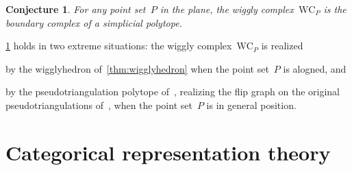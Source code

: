 \documentclass[submission]{FPSAC2025}
\newtheorem{conjecture}[theorem]{Conjecture}
\theoremstyle{definition}
\newcommand{\wigglyComplex}{\mathrm{WC}} %
\begin{document}
\begin{conjecture}
\label{conj:polytopality}
For any point set~$P$ in the plane, the wiggly complex~$\wigglyComplex_P$ is the boundary complex of a simplicial polytope.
\end{conjecture}

\cref{conj:polytopality} holds in two extreme situations: the wiggly complex~$\wigglyComplex_P$ is realized
\begin{compactitem}
\item by the wigglyhedron of~\cref{thm:wigglyhedron} when the point set~$P$ is alogned, and
\item by the pseudotriangulation polytope of~\cite{RoteSantosStreinu-polytope}, realizing the flip graph on the original pseudotriangulations of~\cite{PocchiolaVegter,RoteSantosStreinu-pseudotriangulations}, when the point set~$P$ is in general position.
\end{compactitem}

\newpage
\section{Categorical representation theory}
\label{sec:representationTheory}


\newpage
\printbibliography
\end{document}
